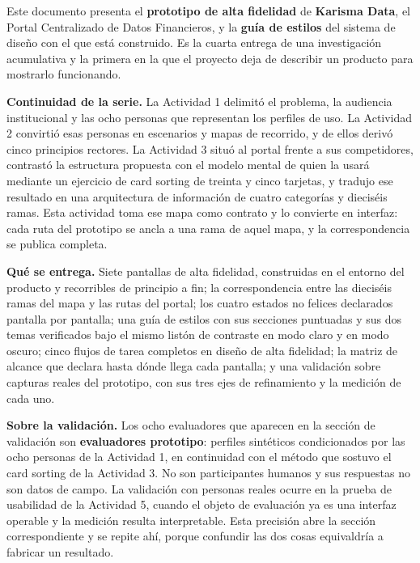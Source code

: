 %


Este documento presenta el \textbf{prototipo de alta fidelidad} de \textbf{Karisma Data}, el Portal
Centralizado de Datos Financieros, y la \textbf{guía de estilos} del sistema de diseño con el que
está construido. Es la cuarta entrega de una investigación acumulativa y la primera en la que el
proyecto deja de describir un producto para mostrarlo funcionando.

\textbf{Continuidad de la serie.} La Actividad 1 delimitó el problema, la audiencia institucional y
las ocho personas que representan los perfiles de uso. La Actividad 2 convirtió esas personas en
escenarios y mapas de recorrido, y de ellos derivó cinco principios rectores. La Actividad 3 situó
al portal frente a sus competidores, contrastó la estructura propuesta con el modelo mental de quien
la usará mediante un ejercicio de card sorting de treinta y cinco tarjetas, y tradujo ese resultado
en una arquitectura de información de cuatro categorías y dieciséis ramas. Esta actividad toma ese
mapa como contrato y lo convierte en interfaz: cada ruta del prototipo se ancla a una rama de aquel
mapa, y la correspondencia se publica completa.

\textbf{Qué se entrega.} Siete pantallas de alta fidelidad, construidas en el entorno del producto y
recorribles de principio a fin; la correspondencia entre las dieciséis ramas del mapa y las rutas
del portal; los cuatro estados no felices declarados pantalla por pantalla; una guía de estilos con
sus secciones puntuadas y sus dos temas verificados bajo el mismo listón de contraste en modo claro
y en modo oscuro; cinco flujos de tarea completos en diseño de alta fidelidad; la matriz de alcance
que declara hasta dónde llega cada pantalla; y una validación sobre capturas reales del prototipo,
con sus tres ejes de refinamiento y la medición de cada uno.

\textbf{Sobre la validación.} Los ocho evaluadores que aparecen en la sección de validación
son \textbf{evaluadores prototipo}: perfiles sintéticos condicionados por las ocho personas de la
Actividad 1, en continuidad con el método que sostuvo el card sorting de la Actividad 3. No son
participantes humanos y sus respuestas no son datos de campo. La validación con personas reales
ocurre en la prueba de usabilidad de la Actividad 5, cuando el objeto de evaluación ya es una
interfaz operable y la medición resulta interpretable. Esta precisión abre la sección
correspondiente y se repite ahí, porque confundir las dos cosas equivaldría a fabricar un resultado.

